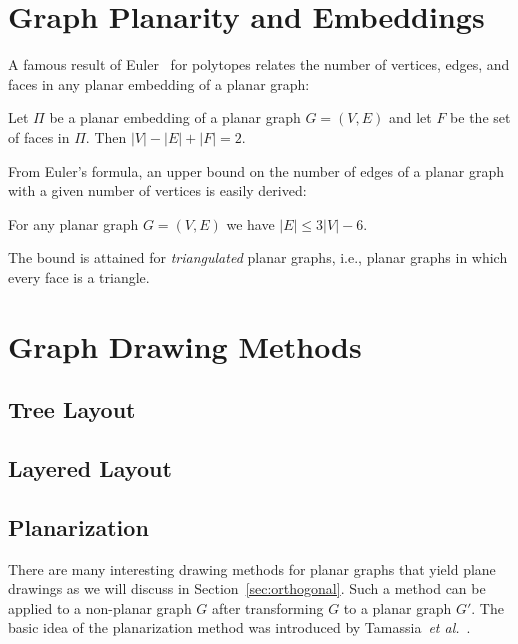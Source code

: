 \documentclass[runningheads]{cl2emult}
\begin{document}
\section{Graph Planarity and Embeddings}\label{sec:embeddings}
%
A famous result of Euler~\cite{Eul1750} for polytopes relates the
number of vertices, edges, and faces in any planar embedding of a
planar graph:

\begin{theorem}
  Let $\Pi$ be a planar embedding of a planar graph $G=(V,E)$ and let
  $F$ be the set of faces in $\Pi$. Then $|V|-|E|+|F|=2$.
\end{theorem}

From Euler's formula, an upper bound on the number of edges of a
planar graph with a given number of vertices is easily derived:

\begin{theorem}
  For any planar graph $G=(V,E)$ we have $|E|\le3|V|-6$.
\end{theorem}

The bound is attained for
\emph{triangulated} planar graphs, i.e.,
planar graphs in which every face is a triangle.

\section{Graph Drawing Methods}\label{sec:methods}
%

\subsection{Tree Layout}\label{sec:tree}
%

\subsection{Layered Layout}\label{sec:layered}
%

\subsection{Planarization}\label{sec:planarization}
%
There are many interesting drawing methods for planar graphs that
yield plane drawings as we will discuss in
Section~\ref{sec:orthogonal}.  Such a method can be applied to a
non-planar graph $G$ after transforming $G$ to a planar graph $G'$.
The basic idea of the planarization method was introduced by
Tamassia~\emph{et al.}~\cite{TDB88}.
\end{document}
